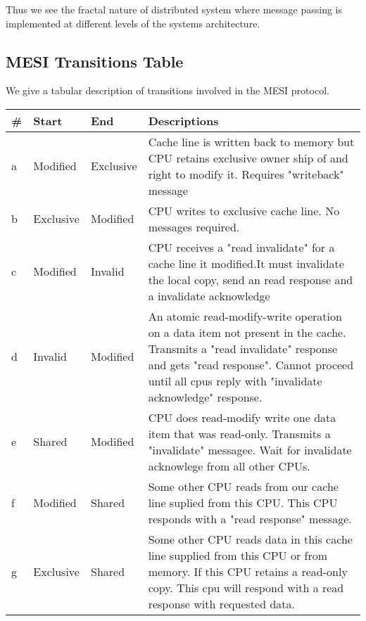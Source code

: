 \documentclass{article}
\begin{document}
Thus we see the fractal nature of distributed system where message
passing is implemented at different levels of the systems
architecture.


\subsection{MESI Transitions Table}

We give a tabular description of transitions involved in the MESI
protocol.



\begin{tabular} {| l | l | l | p{9cm}| }    
    \hline
    \# & Start  & End   & Descriptions \\
    \hline
    a & Modified  & Exclusive &
    Cache line is written back to memory but CPU retains exclusive 
    owner ship of and right to modify it. Requires "writeback" 
    message\\
    \hline
    b& Exclusive & Modified &  
    CPU writes to exclusive cache line. No messages required. \\
    \hline
    c & Modified & Invalid &   
    CPU receives a "read invalidate" for a cache line it modified.It 
    must invalidate the local copy, send an read response and a 
    invalidate acknowledge \\
    \hline
    d & Invalid & Modified &
    An atomic read-modify-write operation on a data item not present
    in the cache. Transmits a "read invalidate" response and gets
    "read response". Cannot proceed until all cpus reply with
    "invalidate acknowledge" response.    \\

    \hline
    e & Shared & Modified & 

    CPU does read-modify write one data item that was
    read-only. Transmits a "invalidate" messagee. Wait for invalidate
    acknowlege from all other CPUs.    
    \\
    \hline
    f & Modified & Shared &

    Some other CPU reads from our cache line suplied from this
    CPU. This CPU responds with a "read response" message.    
    \\    
    \hline

    g & Exclusive & Shared & 


    Some other CPU reads data in this cache line supplied from this
    CPU or from memory. If this CPU retains a read-only copy. This cpu
    will respond with a read response with requested data.
    

\end{tabular}
\end{document}
